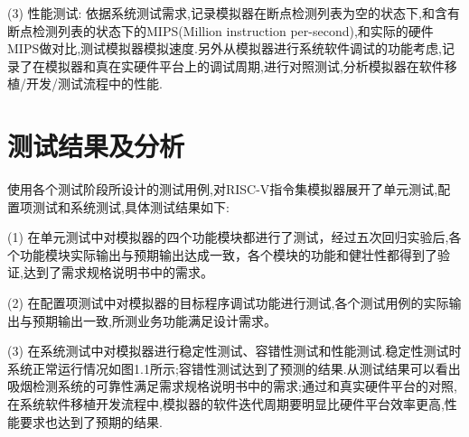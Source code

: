 (3)	性能测试: 依据系统测试需求,记录模拟器在断点检测列表为空的状态下,和含有断点检测列表的状态下的MIPS(Million instruction per-second),和实际的硬件MIPS做对比,测试模拟器模拟速度.另外从模拟器进行系统软件调试的功能考虑,记录了在模拟器和真在实硬件平台上的调试周期,进行对照测试,分析模拟器在软件移植/开发/测试流程中的性能.

\section{测试结果及分析}
使用各个测试阶段所设计的测试用例,对RISC-V指令集模拟器展开了单元测试,配置项测试和系统测试,具体测试结果如下:


(1) 在单元测试中对模拟器的四个功能模块都进行了测试，经过五次回归实验后,各个功能模块实际输出与预期输出达成一致，各个模块的功能和健壮性都得到了验证,达到了需求规格说明书中的需求。


(2) 在配置项测试中对模拟器的目标程序调试功能进行测试,各个测试用例的实际输出与预期输出一致,所测业务功能满足设计需求。


(3) 在系统测试中对模拟器进行稳定性测试、容错性测试和性能测试.稳定性测试时系统正常运行情况如图1.1所示;容错性测试达到了预测的结果.从测试结果可以看出吸烟检测系统的可靠性满足需求规格说明书中的需求;通过和真实硬件平台的对照,在系统软件移植开发流程中,模拟器的软件迭代周期要明显比硬件平台效率更高,性能要求也达到了预期的结果. 

